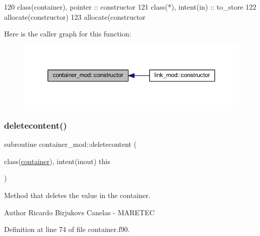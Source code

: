 \begin{DoxyCode}
120     \textcolor{keywordtype}{class}(container), \textcolor{keywordtype}{pointer} :: constructor
121     \textcolor{keywordtype}{class}(*), \textcolor{keywordtype}{intent(in)} :: to\_store
122     \textcolor{keyword}{allocate}(constructor)
123     \textcolor{keyword}{allocate}(constructor%
\end{DoxyCode}
Here is the caller graph for this function\+:
\nopagebreak
\begin{figure}[H]
\begin{center}
\leavevmode
\includegraphics[width=350pt]{namespacecontainer__mod_a6262df4ff34024d566cf8261dc20a248_icgraph}
\end{center}
\end{figure}
\mbox{\label{namespacecontainer__mod_a005e6cba51f5837a8bef1f05bb899c08}} 
\subsubsection{\texorpdfstring{deletecontent()}{deletecontent()}}
{\footnotesize\ttfamily subroutine container\+\_\+mod\+::deletecontent (\begin{DoxyParamCaption}\item[{class(\mbox{\hyperlink{structcontainer__mod_1_1container}{container}}), intent(inout)}]{this }\end{DoxyParamCaption})\hspace{0.3cm}{\ttfamily [private]}}



Method that deletes the value in the container. 

\begin{DoxyAuthor}{Author}
Ricardo Birjukovs Canelas -\/ M\+A\+R\+E\+T\+EC 
\end{DoxyAuthor}


Definition at line 74 of file container.\+f90.


